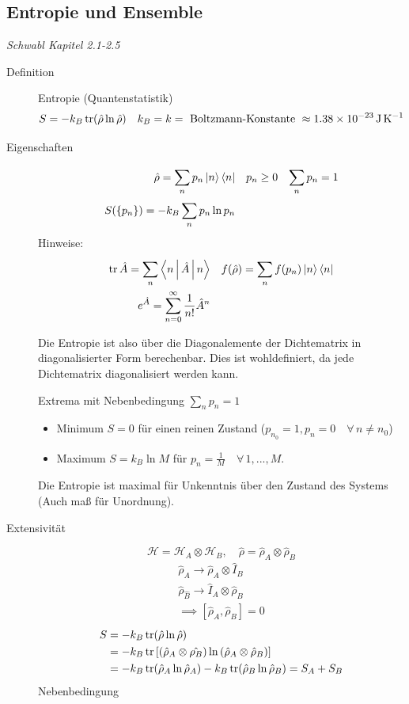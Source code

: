 \subsection*{Entropie und Ensemble}
\emph{Schwabl Kapitel 2.1-2.5}\\
\begin{description}
  \item[Definition] Entropie (Quantenstatistik) \\
    \[ S =-k_B \operatorname{tr}(\hat{\rho} \ln{\hat{\rho}}) \quad k_B = k = 
      \text{ Boltzmann-Konstante }
    \approx \SI{1,38e-23}{\joule\per\kelvin} \] 
  \item[Eigenschaften] 
    \begin{align*}
      \hat{\rho} = \sum_{n}^{} p_n \Ket{n}\Bra{n} && p_n \ge 0 && \sum_{n}^{} p_n = 1 \\
      S(\left\{ p_n \right\}) = -k_B \sum_{n}^{} p_n \ln{p_n}
    \end{align*}
    Hinweise: \begin{align*}
      \operatorname{tr} \hat{A} = \sum_{n}^{} \Braket{n | \hat{A}|n} && f(\hat{\rho})= 
      \sum_{n}^{} f( p_n) \Ket{n}\Bra{n} \\
      e^{\hat{A}}= \sum_{n=0}^{ \infty } \frac{1}{n!}\hat{A}^n
    \end{align*}

    Die Entropie ist also \"uber die Diagonalemente der Dichtematrix in
    diagonalisierter Form berechenbar. Dies ist wohldefiniert, da jede
    Dichtematrix diagonalisiert werden kann.

    Extrema mit Nebenbedingung $\sum_{n}^{} p_n = 1$
    \begin{itemize}
      \item Minimum $S=0$ f\"ur einen reinen Zustand ($p_{n_0}=1, p_n =0
        \quad\forall\, n \neq n_0$)
      \item Maximum $S= k_B \ln{M}$ f\"ur $p_n = \frac{1}{M} \quad\forall\, 1,...,M$.
    \end{itemize}
    Die Entropie ist maximal f\"ur Unkenntnis \"uber den Zustand des Systems
    (Auch ma\ss{} f\"ur Unordnung).
  \item[Extensivit\"at] \[ \mathcal{H}= \mathcal{H}_A \otimes \mathcal{H}_B,
  \quad \hat{\rho} = \hat{\rho}_A \otimes  \hat{\rho}_B \] 
  \begin{align*}
    \hat{\rho}_A \to  \hat{\rho}_A \otimes  \hat{I}_B  \\
    \hat{\rho}_{\hat{B}} \to  \hat{I}_A \otimes  \hat{\rho}_B \\
    \implies \left[ \hat{\rho}_A, \hat{\rho}_B  \right]= 0
  \end{align*}
  \begin{align*}
    S & = -k_B \operatorname{tr}( \hat{\rho} \ln{\hat{\rho}})  \\
      & =  -k_B \operatorname{tr} \left[ (\hat{\rho}_A \otimes \hat{\rho_B}) 
  \ln{(\hat{\rho}_A \otimes \hat{\rho}_B)}  \right]  \\
  & = -k_B \operatorname{tr} (\hat{\rho}_A \ln{ \hat{\rho}_A}) - k_B \operatorname{tr}
    (\hat{\rho}_B \ln{ \hat{\rho}_B}) = S_A + S_B
  \end{align*}
  Nebenbedingung


\end{description}
